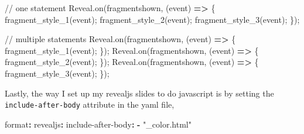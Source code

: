\documentclass[
  letterpaper,
  DIV=11,
  numbers=noendperiod]{scrreprt}
\newenvironment{Shaded}{\begin{snugshade}}{\end{snugshade}}
\newcommand{\AttributeTok}[1]{\textcolor[rgb]{0.40,0.45,0.13}{#1}}
\newcommand{\BuiltInTok}[1]{\textcolor[rgb]{0.00,0.23,0.31}{#1}}
\newcommand{\CommentTok}[1]{\textcolor[rgb]{0.37,0.37,0.37}{#1}}
\newcommand{\FunctionTok}[1]{\textcolor[rgb]{0.28,0.35,0.67}{#1}}
\newcommand{\KeywordTok}[1]{\textcolor[rgb]{0.00,0.23,0.31}{\textbf{#1}}}
\newcommand{\NormalTok}[1]{\textcolor[rgb]{0.00,0.23,0.31}{#1}}
\newcommand{\OperatorTok}[1]{\textcolor[rgb]{0.37,0.37,0.37}{#1}}
\newcommand{\StringTok}[1]{\textcolor[rgb]{0.13,0.47,0.30}{#1}}
\begin{document}
\begin{Shaded}
\begin{Highlighting}[]
\CommentTok{// one statement}
\NormalTok{Reveal}\OperatorTok{.}\FunctionTok{on}\NormalTok{(}\StringTok{\textquotesingle{}fragmentshown\textquotesingle{}}\OperatorTok{,}\NormalTok{ (}\BuiltInTok{event}\NormalTok{) }\KeywordTok{=\textgreater{}}\NormalTok{ \{}
  \FunctionTok{fragment\_style\_1}\NormalTok{(}\BuiltInTok{event}\NormalTok{)}\OperatorTok{;}
  \FunctionTok{fragment\_style\_2}\NormalTok{(}\BuiltInTok{event}\NormalTok{)}\OperatorTok{;}
  \FunctionTok{fragment\_style\_3}\NormalTok{(}\BuiltInTok{event}\NormalTok{)}\OperatorTok{;}
\NormalTok{\})}\OperatorTok{;}

\CommentTok{// multiple statements}
\NormalTok{Reveal}\OperatorTok{.}\FunctionTok{on}\NormalTok{(}\StringTok{\textquotesingle{}fragmentshown\textquotesingle{}}\OperatorTok{,}\NormalTok{ (}\BuiltInTok{event}\NormalTok{) }\KeywordTok{=\textgreater{}}\NormalTok{ \{}
  \FunctionTok{fragment\_style\_1}\NormalTok{(}\BuiltInTok{event}\NormalTok{)}\OperatorTok{;}
\NormalTok{\})}\OperatorTok{;}
\NormalTok{Reveal}\OperatorTok{.}\FunctionTok{on}\NormalTok{(}\StringTok{\textquotesingle{}fragmentshown\textquotesingle{}}\OperatorTok{,}\NormalTok{ (}\BuiltInTok{event}\NormalTok{) }\KeywordTok{=\textgreater{}}\NormalTok{ \{}
  \FunctionTok{fragment\_style\_2}\NormalTok{(}\BuiltInTok{event}\NormalTok{)}\OperatorTok{;}
\NormalTok{\})}\OperatorTok{;}
\NormalTok{Reveal}\OperatorTok{.}\FunctionTok{on}\NormalTok{(}\StringTok{\textquotesingle{}fragmentshown\textquotesingle{}}\OperatorTok{,}\NormalTok{ (}\BuiltInTok{event}\NormalTok{) }\KeywordTok{=\textgreater{}}\NormalTok{ \{}
  \FunctionTok{fragment\_style\_3}\NormalTok{(}\BuiltInTok{event}\NormalTok{)}\OperatorTok{;}
\NormalTok{\})}\OperatorTok{;}
\end{Highlighting}
\end{Shaded}

Lastly, the way I set up my revealjs slides to do javascript is by
setting the \texttt{include-after-body} attribute in the yaml file,

\begin{Shaded}
\begin{Highlighting}[]
\FunctionTok{format}\KeywordTok{:}
\AttributeTok{  }\FunctionTok{revealjs}\KeywordTok{:}
\AttributeTok{    }\FunctionTok{include{-}after{-}body}\KeywordTok{:}\AttributeTok{ }
\AttributeTok{      }\KeywordTok{{-}}\AttributeTok{ }\StringTok{"\_color.html"}
\end{Highlighting}
\end{Shaded}
\end{document}
